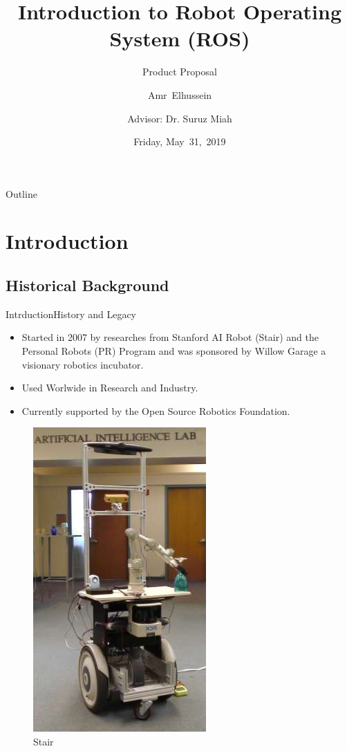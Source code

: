 \documentclass{beamer}
\title[Intro to ROS]{Introduction to Robot Operating System (ROS)}
\subtitle{Product Proposal}
\author[A.Elhussein]{Amr~Elhussein  \\\and
Advisor: Dr. Suruz Miah}
\institute[Bradley University] %
{
  Department of Electrical and Computer Engineering\\
  Bradley University\\
  1501 W. Bradley Avenue\\
  Peoria, IL, 61625, USA
}
\date[May~31,~2019]{Friday, May~31,~2019}
\begin{document}
\begin{frame}
  \titlepage
\end{frame}

\begin{frame}{Outline}
  \tableofcontents
\end{frame}

\section{Introduction}
\subsection{Historical Background}
\begin{frame}{Intrduction}{History and Legacy}
  
\begin{itemize}
  \item
   Started in 2007 by researches from Stanford AI Robot (Stair) and the Personal Robots (PR) Program and was sponsored by Willow Garage a visionary robotics incubator.
  \item
Used Worlwide in Research and Industry.
  \item
    Currently supported by the Open Source Robotics Foundation.
  \end{itemize}
  \begin{figure}
  \includegraphics[scale=0.2]{figs/stair_small}
  \caption{Stair}
  \end{figure}
  
\end{frame}
\end{document}
